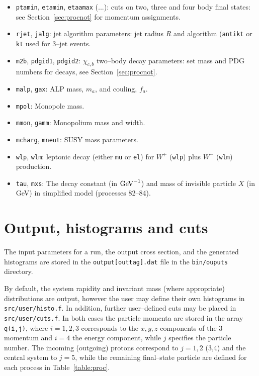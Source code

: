 \documentclass[12pt]{article}
\begin{document}
\begin{itemize}
\item \texttt{ptamin}, \texttt{etamin}, \texttt{etaamax} (...): cuts on two, three and four body final states: see 
Section~\ref{sec:procnot} for momentum assignments.
\item \texttt{rjet}, \texttt{jalg}: jet algorithm parameters: jet radius $R$ and algorithm (\texttt{antikt} or \texttt{kt}  
used for 3--jet events.
\item \texttt{m2b}, \texttt{pdgid1}, \texttt{pdgid2}: $\chi_{c,b}$ two--body decay parameters: set mass and PDG numbers for 
decays, see Section~\ref{sec:procnot}.
\item \texttt{malp}, \texttt{gax}: ALP mass, $m_a$, and couling, $f_a$.
\item \texttt{mpol}: Monopole mass.
\item \texttt{mmon}, \texttt{gamm}: Monopolium mass and width.
\item \texttt{mcharg}, \texttt{mneut}: SUSY mass parameters.
\item \texttt{wlp}, \texttt{wlm}: leptonic decay (either \texttt{mu} or \texttt{el}) for $W^+$ (\texttt{wlp}) plus 
$W^-$ (\texttt{wlm}) production.
\item \texttt{tau}, \texttt{mxs}: The decay constant (in ${\rm GeV}^{-1}$) and mass of invisible particle $X$ (in GeV) 
in simplified model (processes 82--84).
\end{itemize}

\section{Output, histograms and cuts}\label{sec:hist}

The input parameters for a run, the output cross section, and the generated histograms are stored in the \texttt{output[outtag].dat}
 file in the \texttt{bin/ouputs} directory. 

By default, the system rapidity and invariant mass (where appropriate) distributions are output, however the user may define their 
own histograms in \texttt{src/user/histo.f}. In addition, further user--defined cuts may be placed in \texttt{src/user/cuts.f}. In
 both cases the particle momenta are stored in the array \texttt{q(i,j)}, where $i=1,2,3$ corresponds to the $x,y,z$ components of 
 the 3--momentum and $i=4$ the energy component, while $j$ specifies the particle number. The incoming (outgoing) protons correspond 
 to $j=1,2$ (3,4) and the central system to $j=5$, while the remaining final--state particle are defined for each process in Table~\ref{table:proc}.
\end{document}
